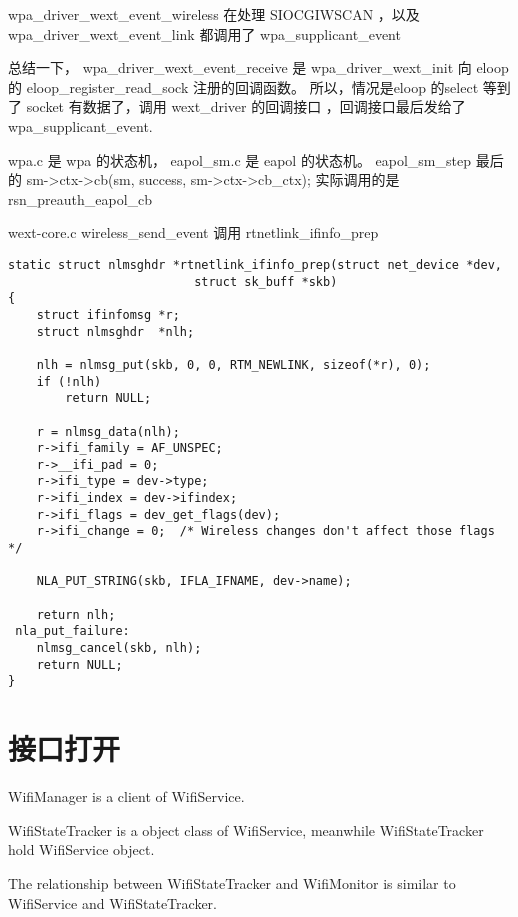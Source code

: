 \documentclass[a4paper,11pt,]{article}%
\begin{document}
wpa_driver_wext_event_wireless  在处理 SIOCGIWSCAN ，以及
wpa_driver_wext_event_link 
都调用了
wpa_supplicant_event

总结一下， wpa_driver_wext_event_receive 是 wpa_driver_wext_init 向 eloop 的 eloop_register_read_sock
注册的回调函数。
所以，情况是eloop 的select 等到了 socket 有数据了，调用 wext_driver 的回调接口
，回调接口最后发给了 wpa_supplicant_event.


wpa.c 是 wpa 的状态机，
eapol_sm.c 是 eapol 的状态机。
eapol_sm_step  最后的 sm->ctx->cb(sm, success, sm->ctx->cb_ctx);
实际调用的是 rsn_preauth_eapol_cb





wext-core.c
wireless_send_event 调用 rtnetlink_ifinfo_prep
\begin{lstlisting}
static struct nlmsghdr *rtnetlink_ifinfo_prep(struct net_device *dev,
					      struct sk_buff *skb)
{
	struct ifinfomsg *r;
	struct nlmsghdr  *nlh;

	nlh = nlmsg_put(skb, 0, 0, RTM_NEWLINK, sizeof(*r), 0);
	if (!nlh)
		return NULL;

	r = nlmsg_data(nlh);
	r->ifi_family = AF_UNSPEC;
	r->__ifi_pad = 0;
	r->ifi_type = dev->type;
	r->ifi_index = dev->ifindex;
	r->ifi_flags = dev_get_flags(dev);
	r->ifi_change = 0;	/* Wireless changes don't affect those flags */

	NLA_PUT_STRING(skb, IFLA_IFNAME, dev->name);

	return nlh;
 nla_put_failure:
	nlmsg_cancel(skb, nlh);
	return NULL;
}
\end{lstlisting}

%        

\section{接口打开}
\newcommand{\wpactrl}{wpa\_ctrl.c}

WifiManager is a client of WifiService.

WifiStateTracker is a object class of WifiService, meanwhile WifiStateTracker
hold WifiService object. 

The relationship between WifiStateTracker and
WifiMonitor is similar to WifiService and WifiStateTracker.
\end{document}
